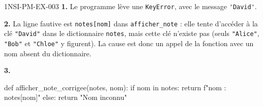 \begin{corrige}{1NSI-PM-EX-003}
\textbf{1.} Le programme lève une \lstinline{KeyError}, avec le message
\lstinline{'David'}.

\textbf{2.} La ligne fautive est \lstinline{notes[nom]} dans \lstinline{afficher_note} :
elle tente d'accéder à la clé \lstinline{"David"} dans le dictionnaire \lstinline{notes},
mais cette clé n'existe pas (seuls \lstinline{"Alice"}, \lstinline{"Bob"} et
\lstinline{"Chloe"} y figurent). La cause est donc un appel de la fonction avec un nom
absent du dictionnaire.

\textbf{3.}
\begin{python}
def afficher_note_corrigee(notes, nom):
    if nom in notes:
        return f"{nom} : {notes[nom]}"
    else:
        return "Nom inconnu"
\end{python}
\end{corrige}
